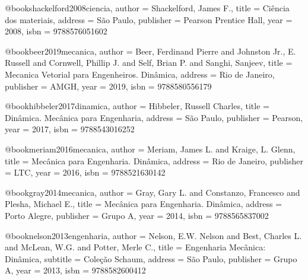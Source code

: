 @book{shackelford2008ciencia,
  author = {Shackelford, James F.},
  title = {Ciência dos materiais},
  address = {São Paulo},
  publisher = {Pearson Prentice Hall},
  year = {2008},
  isbn = {9788576051602}
}

%

@book{beer2019mecanica,
  author = {Beer, Ferdinand Pierre and Johnston Jr., E. Russell and Cornwell, Phillip J. and Self, Brian P. and Sanghi, Sanjeev},
  title = {Mecanica Vetorial para Engenheiros. Dinâmica},
  address = {Rio de Janeiro},
  publisher = {AMGH},
  year = {2019},
  isbn = {9788580556179}%
}

@book{hibbeler2017dinamica,
  author = {Hibbeler, Russell Charles},
  title = {Dinâmica. Mecânica para Engenharia},
  address = {São Paulo},
  publisher = {Pearson},
  year = {2017},
  isbn = {9788543016252}
}

@book{meriam2016mecanica,
  author = {Meriam, James L. and Kraige, L. Glenn},
  title = {Mecânica para Engenharia. Dinâmica},
  address = {Rio de Janeiro},
  publisher = {LTC},
  year = {2016},
  isbn = {9788521630142}
}

@book{gray2014mecanica,
  author = {Gray, Gary L. and Constanzo, Francesco and Plesha, Michael E.},
  title = {Mecânica para Engenharia. Dinâmica},
  address = {Porto Alegre},
  publisher = {Grupo A},
  year = {2014},
  isbn = {9788565837002}%
}

@book{nelson2013engenharia,
  author = {Nelson, E.W. Nelson and Best, Charles L. and McLean, W.G. and Potter, Merle C.},
  title = {Engenharia Mecânica: Dinâmica},
  subtitle = {Coleção Schaum},
  address = {São Paulo},
  publisher = {Grupo A},
  year = {2013},
  isbn = {9788582600412}
}

